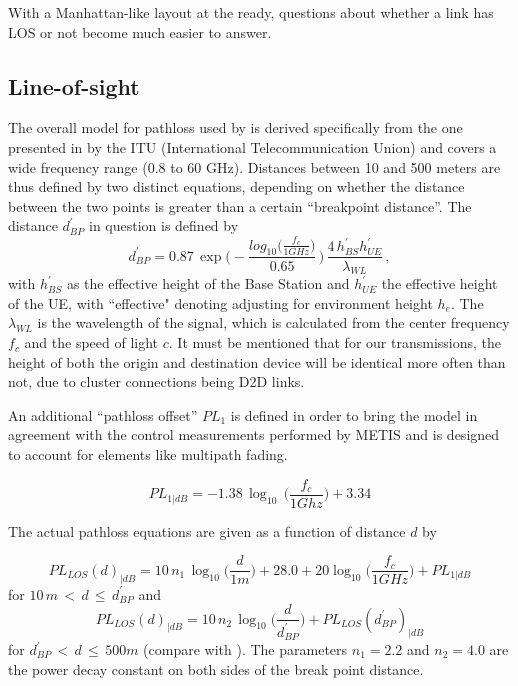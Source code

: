With a Manhattan-like layout at the ready, questions about whether a link has LOS or not become much easier to answer.

\subsection{Line-of-sight} \label{LOS}
The overall model for pathloss used by \cite{Raschkowski} is derived specifically from the one presented in \cite{ReportITU-RM.2135-12009} by the ITU (International Telecommunication Union) and covers a wide frequency range (0.8 to 60 GHz). Distances between 10 and 500 meters are thus defined by two distinct equations, depending on whether the distance between the two points is greater than a certain ``breakpoint distance''. The distance $d^\prime_{BP}$ in question is defined by
\begin{equation} \label{eq:dbp}
d^\prime_{BP} = 0.87\, \exp\bigg( -\frac {log_{10} \big( \frac {f_c} {1GHz} \big)} {0.65} \,\bigg)\,\frac{4\,h^\prime_{BS}h^\prime_{UE}}{\lambda_{WL}}\,,
\end{equation}
with $h^\prime_{BS}$ as the effective height of the Base Station and $h^\prime_{UE}$ the effective height of the UE, with ``effective" denoting adjusting for environment height $h_e$. The $\lambda_{WL}$ is the wavelength of the signal, which is calculated from the center frequency $f_c$ and the speed of light $c$. It must be mentioned that for our transmissions, the height of both the origin and destination device will be identical more often than not, due to cluster connections being D2D links.

An additional ``pathloss offset'' $PL_1$ is defined in order to bring the model in agreement with the control measurements performed by METIS and is designed to account for elements like multipath fading.

\begin{equation} \label{eq:PL_1}
PL_{1|dB} = -1.38\,\log_{10}\,\bigg( \frac {f_c}{1Ghz} \bigg) + 3.34
\end{equation}


The actual pathloss equations are given as a function of distance $d$ by

\begin{equation} \label{eq:PL_LOS_1}
  PL_{LOS}(d)_{|dB} = 10\,n_1\,\log_{10}\bigg( \frac{d}{1m} \bigg) + 28.0 + 20 \log_{10} \bigg( \frac{f_c}{1GHz} \bigg) + PL_{1|dB}
\end{equation}
for $10\,m\,<\,d\, \le \,d^\prime_{BP}$ and
\begin{equation} \label{eq:PL_LOS_2}
  PL_{LOS}(d)_{|dB} = 10\,n_2\,\log_{10}\bigg( \frac{d}{d^\prime_{BP}} \bigg) + PL_{LOS}(d^\prime_{BP})_{|dB}
\end{equation}
for $d^\prime_{BP}\,<\,d\, \le \,500 m$ (compare with \cite{Raschkowski}). The parameters $n_1 = 2.2$ and $n_2 = 4.0$ are the power decay constant on both sides of the break point distance.

